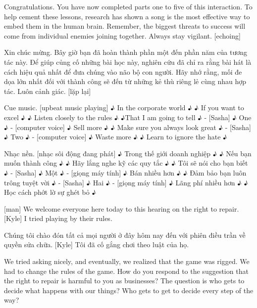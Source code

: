 \documentclass[a4paper]{article}
\begin{document}
	Congratulations.
	You have now completed parts one to five of this interaction.
	To help cement these lessons, research has shown a song is the most effective way to embed them in the human brain.
	Remember, the biggest threats to success will come from individual enemies joining together.
	Always stay vigilant. [echoing]
	
	\begin{vietnamese-v2}
		Xin chúc mừng.
		Bây giờ bạn đã hoàn thành phần một đến phần năm của tương tác này.
		Để giúp củng cố những bài học này, nghiên cứu đã chỉ ra rằng bài hát là cách hiệu quả nhất để đưa chúng vào não bộ con người.
		Hãy nhớ rằng, mối đe dọa lớn nhất đối với thành công sẽ đến từ những kẻ thù riêng lẻ cùng nhau hợp tác.
		Luôn cảnh giác. [lặp lại]
	\end{vietnamese-v2}
	
	Cue music.
	[upbeat music playing]
	♪ In the corporate world ♪
	♪ If you want to excel ♪
	♪ Listen closely to the rules ♪
	♪That I am going to tell ♪
	- [Sasha] ♪ One ♪ - [computer voice] ♪ Sell more ♪
	♪ Make sure you always look great ♪
	- [Sasha] ♪ Two ♪ - [computer voice] ♪ Waste more ♪
	♪ Learn to ignore the hate ♪
	
	\begin{vietnamese-v2}
		Nhạc nền.
		[nhạc sôi động đang phát]
		♪ Trong thế giới doanh nghiệp ♪
		♪ Nếu bạn muốn thành công ♪
		♪ Hãy lắng nghe kỹ các quy tắc ♪
		♪ Tôi sẽ nói cho bạn biết ♪
		- [Sasha] ♪ Một ♪ - [giọng máy tính] ♪ Bán nhiều hơn ♪
		♪ Đảm bảo bạn luôn trông tuyệt vời ♪
		- [Sasha] ♪ Hai ♪ - [giọng máy tính] ♪ Lãng phí nhiều hơn ♪
		♪ Học cách phớt lờ sự ghét bỏ ♪
	\end{vietnamese-v2}
	
	[man] We welcome everyone here today to this hearing on the right to repair.
	[Kyle] I tried playing by their rules.
	
	\begin{vietnamese-v2}
		 Chúng tôi chào đón tất cả mọi người ở đây hôm nay đến với phiên điều trần về quyền sửa chữa.
		[Kyle] Tôi đã cố gắng chơi theo luật của họ.
	\end{vietnamese-v2}
	
	We tried asking nicely, and eventually, we realized that the game was rigged.
	We had to change the rules of the game.
	How do you respond to the suggestion that the right to repair is harmful to you as businesses?
	The question is who gets to decide what happens with our things?
	Who gets to get to decide every step of the way?
	
\end{document}
